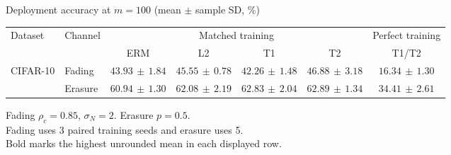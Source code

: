\documentclass[border=4pt]{standalone}
\begin{document}
\begin{minipage}{7.8in}
\centering
Deployment accuracy at $m=100$ (mean $\pm$ sample SD, \%)\\[4pt]
\begin{tabular*}{\linewidth}{@{\extracolsep{\fill}}llccccc@{}}
\toprule
\multirow{2}{*}{Dataset} & \multirow{2}{*}{Channel} & \multicolumn{4}{c}{Matched training} & Perfect training \\
\cmidrule(lr){3-6}\cmidrule(l){7-7}
 & & ERM & L2 & T1 & T2 & T1/T2 \\
\midrule
\multirow{2}{*}{CIFAR-10} & Fading & $43.93\,\pm\,1.84$ & $45.55\,\pm\,0.78$ & $42.26\,\pm\,1.48$ & $\mathbf{46.88}\,\pm\,3.18$ & $16.34\,\pm\,1.30$ \\
 & Erasure & $60.94\,\pm\,1.30$ & $62.08\,\pm\,2.19$ & $62.83\,\pm\,2.04$ & $\mathbf{62.89}\,\pm\,1.34$ & $34.41\,\pm\,2.61$ \\
\bottomrule
\end{tabular*}
\par\smallskip\raggedright\footnotesize
Fading $\rho_c=0.85$, $\sigma_N=2$. Erasure $p=0.5$.\\
Fading uses 3 paired training seeds and erasure uses 5.\\
Bold marks the highest unrounded mean in each displayed row.
\end{minipage}
\end{document}
